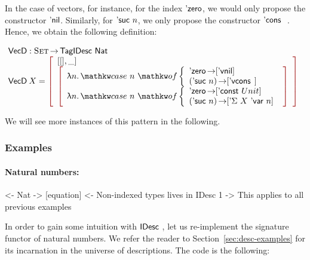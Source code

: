 In the case of vectors, for instance, for the index $\NatZero$, we
would only propose the constructor $\ListNil$. Similarly, for
$\NatSuc{n}$, we only propose the constructor $\ListCons{}{}$. Hence,
we obtain the following definition:

\newcommand{\VecD}{\C{VecD}}
\newcommand{\VecNil}{\etag{\CN{vnil}}}
\newcommand{\VecCons}[2]{\etag{\CN{vcons}}\:#1\:#2}

\[\stk{
\VecD : \Set \To \TagIDesc{\Nat} \\
\begin{array}{@{}ll}
\VecD\: X = \bigRedBracket{ 
            \begin{array}{l}
                \pair{[]}{\_}{} \\
                \bigRedBracket{
                \begin{array}{l} 
                  \LAM{n} \caseB{n}{\NatZero \To [\VecNil] \\
                                   (\NatSuc n) \To [\VecCons{}{}]} \\
                  \LAM{n} \caseB{n}{\NatZero \To [\DConst{Unit}] \\
                                   (\NatSuc n) \To [\DSigma{X}{\DVar{n}}]}
                \end{array}}
            \end{array}}
\end{array}
}\]

We will see more instances of this pattern in the following.




\subsubsection{Examples}
\label{sec:idesc-examples}

\paragraph{Natural numbers:}

\begin{wstructure}
<- Nat
    -> [equation]
    <- Non-indexed types lives in IDesc 1
        -> This applies to all previous examples
\end{wstructure}

In order to gain some intuition with $\IDesc$, let us re-implement the
signature functor of natural numbers. We refer the reader to
Section~\ref{sec:desc-examples} for its incarnation in the universe of
descriptions. The code is the following:

